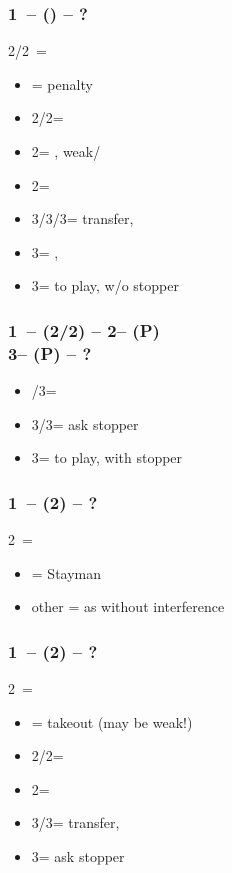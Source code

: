 \documentclass[12pt, a4paper]{report}
\begin{document}
{{{            \subsubsection*{1\ntx\ -- (\alrts{2\clubs/2\diams}) -- ?}
            2\clubs/2\diams\ = \major
            \begin{itemize}
                \item \dbl = penalty
                \item 2\diams/2\hearts = \nat\ \nf
                \item 2\spades = \minor, weak/\gf
                \item 2\nt = \leb
                \item 3\clubs/3\diams/3\hearts = transfer, \invp
                \item 3\spades = \trsf{\clubs}, \gf
                \item 3\nt = to play, w/o stopper
            \end{itemize}

            \subsubsection*{1\ntx\ -- (2\clubs/2\diams) -- 2\nt -- (P)\\
                            3\clubs -- (P) -- ?}
            \begin{itemize}
                \item \pass/3\diams = \soff
                \item 3\hearts/3\spades = ask stopper
                \item 3\nt = to play, with stopper
            \end{itemize}

            \subsubsection*{1\ntx\ -- (2\clubs) -- ?}
            2\clubs\ = \nat
            \begin{itemize}
                \item \dbl = Stayman
                \item other = as without interference
            \end{itemize}

            \subsubsection*{1\ntx\ -- (2\diams) -- ?}
            2\diams\ = \nat
            \begin{itemize}
                \item \dbl = takeout (may be weak!)
                \item 2\hearts/2\spades = \nat\ \nf
                \item 2\nt = \leb
                \item 3\diams/3\hearts = transfer, \invp
                \item 3\clubs = ask stopper
            \end{itemize}

}}}
\end{document}
